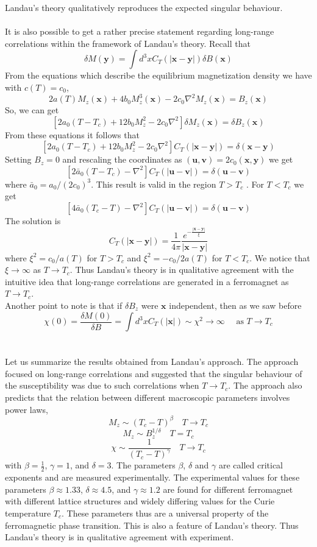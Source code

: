 Landau's theory qualitatively reproduces the expected singular behaviour.
\\ \\
It is also possible to get a rather precise statement regarding long-range correlations within the framework of Landau's theory. Recall that
\[\delta M(\bm{y}) = \int d^3x C_T(|\bm{x}-\bm{y}|)\delta B(\bm{x})\]
From the equations which describe the equilibrium magnetization density we have with $c(T) = c_0$,
\[2a(T)M_z(\bm{x}) + 4b_0M_z^3(\bm{x})- 2c_0\nabla^2M_z(\bm{x}) = B_z(\bm{x})\]
So, we can get
\[[2a_0(T-T_c) + 12b_0M_z^2 - 2c_0\nabla^2] \delta M_z(\bm{x}) = \delta B_z(\bm{x})\]
From these equations it follows that
\[[2a_0(T-T_c) + 12b_0M_z^2 - 2c_0\nabla^2]C_T(|\bm{x} - \bm{y}|) = \delta(\bm{x} - \bm{y}) \]
Setting $B_z = 0$ and rescaling the coordinates as $(\bm{u},\bm{v}) = 2c_0(\bm{x},\bm{y})$ we get
\[[2\bar{a}_0(T-T_c) - \nabla^2] C_T(|\bm{u} - \bm{v}|) = \delta(\bm{u} - \bm{v})\]
where $\bar{a}_0 = a_0/(2c_0)^3$.
This result is valid in the region $T > T_c$ . For $T < T_c$ we get
\[[4\bar{a}_0(T_c-T) - \nabla^2] C_T(|\bm{u} - \bm{v}|) = \delta(\bm{u} - \bm{v})\]
The solution is
\[C_T(|\bm{x} - \bm{y}|) = \frac{1}{4\pi} \frac{e^{-\frac{|\bm{x} - \bm{y}|}{\xi}}}{|\bm{x} - \bm{y}|}\]
where $\xi^2 = c_0/a(T)$ for $T > T_c$ and $\xi^2 = -c_0/2a(T)$ for $T < T_c$.
We notice that $\xi \to \infty$ as $T \to T_c$. Thus Landau's theory is in qualitative agreement with the intuitive idea that long-range correlations are generated in a ferromagnet as $T \to T_c$.
\\
Another point to note is that if $\delta B_z$ were $\bm{x}$ independent, then as we saw before
\[\chi(0) = \frac{\delta M(0)}{\delta B} = \int d^3x C_T(|\bm{x}|) \sim \chi^2 \to \infty \quad \mbox{ as } T \to T_c\]
\\ \\
Let us summarize the results obtained from Landau's approach. The approach focused on long-range correlations and suggested that the singular behaviour of the susceptibility was due to such correlations when $T \to T_c$. 
The approach also predicts that the relation between different macroscopic parameters involves power laws,
\[M_z \sim (T_c - T)^{\beta} \quad T \to T_c\]
\[M_z \sim B_z^{1/\delta} \quad T = T_c\]
\[\chi \sim \frac{1}{(T_c-T)^{\gamma}} \quad T \to T_c\]
with $\beta = \frac{1}{2}$, $\gamma = 1$, and $\delta = 3$. The parameters $\beta$, $\delta$ and $\gamma$ are called critical exponents and are measured experimentally. 
The experimental values for these parameters
$\beta \approx 1.33$, $\delta \approx 4.5$, and $\gamma \approx 1.2$ are found for different ferromagnet with different lattice structures and widely differing values for the Curie temperature $T_c$. 
These parameters thus are a universal property of the ferromagnetic phase transition. This is also a feature of Landau's theory. Thus Landau's theory is in qualitative
agreement with experiment.

